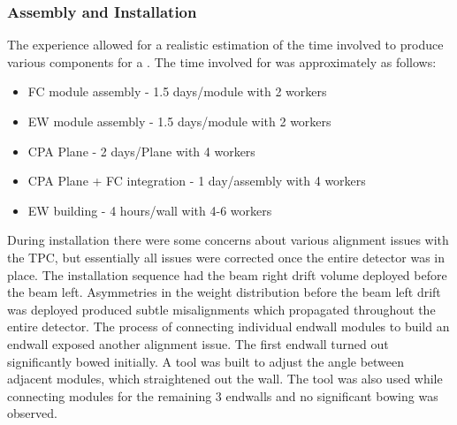 \subsubsection{Assembly and Installation}
\label{sec:fdsp-hv-protodune-lessons-assy}
The  experience allowed for a realistic estimation of the time involved to produce various  components for a .
The time involved for  was approximately as follows:
\begin{itemize}
\item FC module assembly - 1.5 days/module with 2 workers
\item EW module assembly - 1.5 days/module with 2 workers
\item CPA Plane - 2 days/Plane with 4 workers
\item CPA Plane + FC integration - 1 day/assembly with 4 workers
\item EW building - 4 hours/wall with 4-6 workers
\end{itemize}
During installation there were some concerns about various alignment issues with the TPC, but essentially all issues were corrected once the entire detector was in place.
The  installation sequence had the beam right drift volume deployed before the beam left.
Asymmetries in the weight distribution before the beam left drift was deployed produced subtle misalignments which propagated throughout the entire detector.
The process of connecting individual endwall modules to build an endwall exposed another alignment issue.
The first endwall turned out significantly bowed initially.
A tool was built to adjust the angle between adjacent modules, which straightened out the wall.
The tool was also used while connecting modules for the remaining 3 endwalls and no significant bowing was observed.


